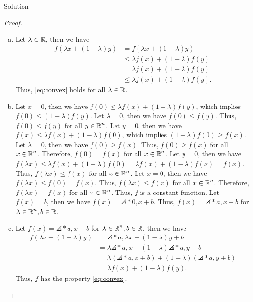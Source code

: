 \documentclass{article}
\begin{document}
\begin{solution}
    {Solution}
    \begin{proof}
        \begin{enumerate}[(a)]
            \item Let $\lambda\in\operatorname{\mathbb{R}}$, then we have {
                \begin{align*}
                    f(\lambda x+(1-\lambda)y) &= f(\lambda x+(1-\lambda)y)\\
                    &\leq \lambda f(x)+(1-\lambda)f(y)\\
                    &= \lambda f(x)+(1-\lambda)f(y)\\
                    &\leq \lambda f(x)+(1-\lambda)f(y).
                \end{align*}
            }
            Thus, \cref{eq:convex} holds for all $\lambda\in\operatorname{\mathbb{R}}$.
            \item Let $x=0$, then we have $f(0)\leq \lambda f(x)+(1-\lambda)f(y)$, which implies $f(0)\leq (1-\lambda)f(y)$. Let $\lambda=0$, then we have $f(0)\leq f(y)$. Thus, $f(0)\leq f(y)$ for all $y\in\operatorname{\mathbb{R}}^n$. Let $y=0$, then we have $f(x)\leq \lambda f(x)+(1-\lambda)f(0)$, which implies $(1-\lambda)f(0)\geq f(x)$. Let $\lambda=0$, then we have $f(0)\geq f(x)$. Thus, $f(0)\geq f(x)$ for all $x\in\operatorname{\mathbb{R}}^n$. Therefore, $f(0)=f(x)$ for all $x\in\operatorname{\mathbb{R}}^n$. Let $y=0$, then we have $f(\lambda x)\leq \lambda f(x)+(1-\lambda)f(0)=\lambda f(x)+(1-\lambda)f(x)=f(x)$. Thus, $f(\lambda x)\leq f(x)$ for all $x\in\operatorname{\mathbb{R}}^n$. Let $x=0$, then we have $f(\lambda x)\leq f(0)=f(x)$. Thus, $f(\lambda x)\leq f(x)$ for all $x\in\operatorname{\mathbb{R}}^n$. Therefore, $f(\lambda x)=f(x)$ for all $x\in\operatorname{\mathbb{R}}^n$. Thus, $f$ is a constant function. Let $f(x)=b$, then we have $f(x)=\angles*{0,x}+b$. Thus, $f(x)=\angles*{a,x}+b$ for $\lambda\in\operatorname{\mathbb{R}}^n,b\in\operatorname{\mathbb{R}}$.
            \item Let $f(x)=\angles*{a,x}+b$ for $\lambda\in\operatorname{\mathbb{R}}^n,b\in\operatorname{\mathbb{R}}$, then we have {
                \begin{align*}
                    f(\lambda x+(1-\lambda)y) &= \angles*{a,\lambda x+(1-\lambda)y}+b\\
                    &= \lambda\angles*{a,x}+(1-\lambda)\angles*{a,y}+b\\
                    &= \lambda(\angles*{a,x}+b)+(1-\lambda)(\angles*{a,y}+b)\\
                    &= \lambda f(x)+(1-\lambda)f(y).
                \end{align*}
            }
            Thus, $f$ has the property \cref{eq:convex}.
        \end{enumerate}
    \end{proof}
\end{solution}
\end{document}
